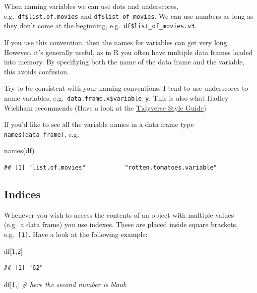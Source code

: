 \documentclass[]{article}
\newenvironment{Shaded}{\begin{snugshade}}{\end{snugshade}}
\newcommand{\CommentTok}[1]{\textcolor[rgb]{0.56,0.35,0.01}{\textit{#1}}}
\newcommand{\DecValTok}[1]{\textcolor[rgb]{0.00,0.00,0.81}{#1}}
\newcommand{\FunctionTok}[1]{\textcolor[rgb]{0.00,0.00,0.00}{#1}}
\newcommand{\NormalTok}[1]{#1}
\begin{document}
When naming variables we can use dots and underscores,
e.g.~\texttt{df\$list.of.movies} and \texttt{df\$list\_of\_movies}. We
can use numbers as long as they don't come at the beginning,
e.g.~\texttt{df\$list\_of\_movies.v3}.

If you use this convention, then the names for variables can get very
long. However, it's generally useful, as in R you often have multiple
data frames loaded into memory. By specifiying both the name of the data
frame and the variable, this avoids confusion.

Try to be consistent with your naming conventions. I tend to use
underscores to name variables, e.g.~\texttt{data.frame.x\$variable\_y}.
This is also what Hadley Wickham recommends (Have a look at the
\href{https://style.tidyverse.org/}{Tidyverse Style Guide})

If you'd like to see all the variable names in a data frame type
\texttt{names(data\_frame)}, e.g.~

\begin{Shaded}
\begin{Highlighting}[]
\FunctionTok{names}\NormalTok{(df)}
\end{Highlighting}
\end{Shaded}

\begin{verbatim}
## [1] "list.of.movies"           "rotten.tomatoes.variable"
\end{verbatim}

\hypertarget{indices}{%
\subsection{Indices}\label{indices}}

Whenever you wish to access the contents of an object with multiple
values (e.g.~a data frame) you use indexes. These are placed inside
square brackets, e.g.~\texttt{{[}1{]}}. Have a look at the following
example:

\begin{Shaded}
\begin{Highlighting}[]
\NormalTok{df[}\DecValTok{1}\NormalTok{,}\DecValTok{2}\NormalTok{]}
\end{Highlighting}
\end{Shaded}

\begin{verbatim}
## [1] "62"
\end{verbatim}

\begin{Shaded}
\begin{Highlighting}[]
\NormalTok{df[}\DecValTok{1}\NormalTok{,] }\CommentTok{\# here the second number is blank}
\end{Highlighting}
\end{Shaded}
\end{document}
